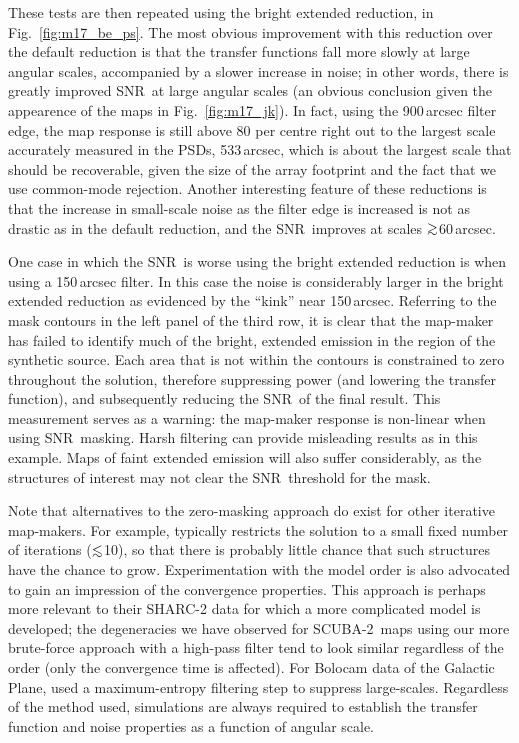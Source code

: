 \documentclass[useAMS,usenatbib,nofootinbib]{mn2e}
\newcommand{\snr}{SNR}
\newcommand{\scuba}{SCUBA-2}
\def\lsim{\mathrel{\lower2.5pt\vbox{\lineskip=0pt\baselineskip=0pt
          \hbox{$<$}\hbox{$\sim$}}}}
\def\gsim{\mathrel{\lower2.5pt\vbox{\lineskip=0pt\baselineskip=0pt
          \hbox{$>$}\hbox{$\sim$}}}}
\begin{document}
These tests are then repeated using the bright extended reduction, in
Fig.~\ref{fig:m17_be_ps}. The most obvious improvement with this
reduction over the default reduction is that the transfer functions
fall more slowly at large angular scales, accompanied by a slower
increase in noise; in other words, there is greatly improved \snr\ at
large angular scales (an obvious conclusion given the appearence of
the maps in Fig.~\ref{fig:m17_jk}). In fact, using the 900\,arcsec
filter edge, the map response is still above 80 per centre right out to
the largest scale accurately measured in the PSDs, 533\,arcsec, which
is about the largest scale that should be recoverable, given the size
of the array footprint and the fact that we use common-mode rejection.
Another interesting feature of these reductions is that the increase
in small-scale noise as the filter edge is increased is not as drastic
as in the default reduction, and the \snr\ improves at scales
$\gsim$60\,arcsec.

One case in which the \snr\ is worse using the bright extended
reduction is when using a 150\,arcsec filter. In this case the noise
is considerably larger in the bright extended reduction as evidenced
by the ``kink'' near 150\,arcsec. Referring to the mask contours in
the left panel of the third row, it is clear that the map-maker has
failed to identify much of the bright, extended emission in the region
of the synthetic source. Each area that is not within the contours is
constrained to zero throughout the solution, therefore suppressing
power (and lowering the transfer function), and subsequently reducing
the \snr\ of the final result. This measurement serves as a warning:
the map-maker response is non-linear when using \snr\ masking. Harsh
filtering can provide misleading results as in this example. Maps of
faint extended emission will also suffer considerably, as the
structures of interest may not clear the \snr\ threshold for the mask.

Note that alternatives to the zero-masking approach do exist for other
iterative map-makers. For example, \citet{kovacs2008} typically
restricts the solution to a small fixed number of iterations
($\lsim$10), so that there is probably little chance that such
structures have the chance to grow. Experimentation with the model
order is also advocated to gain an impression of the convergence
properties. This approach is perhaps more relevant to their SHARC-2
data for which a more complicated model is developed; the degeneracies
we have observed for \scuba\ maps using our more brute-force approach
with a high-pass filter tend to look similar regardless of the order
(only the convergence time is affected).  For Bolocam data of the
Galactic Plane, \citet{aguirre2011} used a maximum-entropy filtering
step to suppress large-scales. Regardless of the method used,
simulations are always required to establish the transfer function and
noise properties as a function of angular scale.
\end{document}
